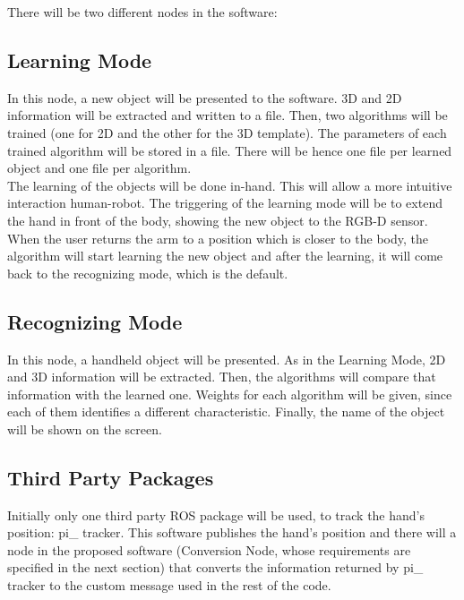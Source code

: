 \documentclass{article}
\begin{document}
There will be two different nodes in the software:

\subsection{Learning Mode}

\hspace{0.5cm}In this node, a new object will be presented to the software. 3D and 2D information will be extracted and written to a file. Then, two algorithms will be trained (one for 2D and the other for the 3D template). The parameters of each trained algorithm will be stored in a file. There will be hence one file per learned object and one file per algorithm.
\\

The learning of the objects will be done in-hand. This will allow a more intuitive interaction human-robot. The triggering of the learning mode will be to extend the hand in front of the body, showing the new object to the RGB-D sensor. When the user returns the arm to a position which is closer to the body, the algorithm will start learning the new object and after the learning, it will come back to the recognizing mode, which is the default. 


\subsection{Recognizing Mode} 
\hspace{0.5cm}In this node, a handheld object will be presented. As in the Learning Mode, 2D and 3D information will be extracted. Then, the algorithms will compare that information with the learned one. Weights for each algorithm will be given, since each of them identifies a different characteristic. Finally, the name of the object will be shown on the screen. 


\subsection{Third Party Packages}
\hspace{0.5cm}Initially only one third party ROS package will be used, to track the hand's position: pi\_ tracker. This software publishes the hand's position and there will a node in the proposed software (Conversion Node, whose requirements are specified in the next section) that converts the information returned by pi\_ tracker to the custom message used in the rest of the code.  
\end{document}
